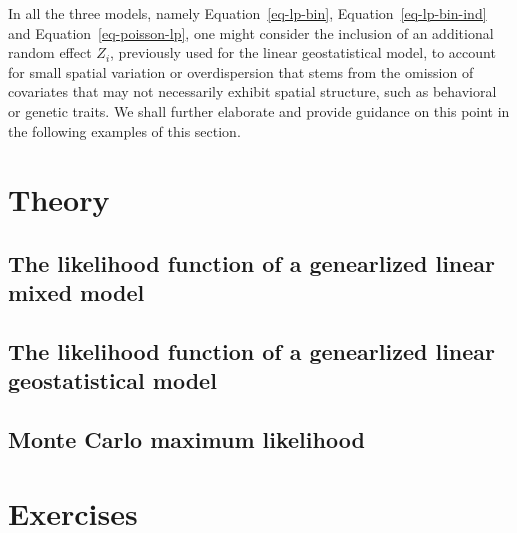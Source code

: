 \documentclass[
  letterpaper,
]{krantz}
\begin{document}
In all the three models, namely Equation~\ref{eq-lp-bin},
Equation~\ref{eq-lp-bin-ind} and Equation~\ref{eq-poisson-lp}, one might
consider the inclusion of an additional random effect \(Z_i\),
previously used for the linear geostatistical model, to account for
small spatial variation or overdispersion that stems from the omission
of covariates that may not necessarily exhibit spatial structure, such
as behavioral or genetic traits. We shall further elaborate and provide
guidance on this point in the following examples of this section.

\hypertarget{theory}{%
\section{Theory}\label{theory}}

\hypertarget{the-likelihood-function-of-a-genearlized-linear-mixed-model}{%
\subsection{The likelihood function of a genearlized linear mixed
model}\label{the-likelihood-function-of-a-genearlized-linear-mixed-model}}

\hypertarget{the-likelihood-function-of-a-genearlized-linear-geostatistical-model}{%
\subsection{The likelihood function of a genearlized linear
geostatistical
model}\label{the-likelihood-function-of-a-genearlized-linear-geostatistical-model}}

\hypertarget{monte-carlo-maximum-likelihood}{%
\subsection{Monte Carlo maximum
likelihood}\label{monte-carlo-maximum-likelihood}}

\hypertarget{exercises}{%
\section{Exercises}\label{exercises}}
\end{document}

